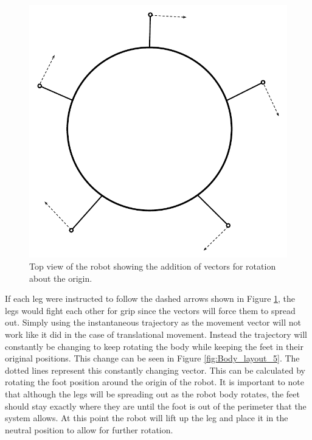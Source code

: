 \FloatBarrier
\begin{figure}[h]
\centering
\includegraphics[scale = 1]{pics/Body_Layout_4.pdf}
\caption{Top view of the robot showing the addition of vectors for rotation about the origin.}
\label{fig:Body_layout_4}
\end{figure}
\FloatBarrier

If each leg were instructed to follow the dashed arrows shown in Figure \ref{fig:Body_layout_4}, the legs would fight each other for grip since the vectors will force them to spread out. Simply using the instantaneous trajectory as the movement vector will not work like it did in the case of translational movement. Instead the trajectory will constantly be changing to keep rotating the body while keeping the feet in their original positions. This change can be seen in Figure \ref{fig:Body_layout_5}. The dotted lines represent this constantly changing vector. This can be calculated by rotating the foot position around the origin of the robot. It is important to note that although the legs will be spreading out as the robot body rotates, the feet should stay exactly where they are until the foot is out of the perimeter that the system allows. At this point the robot will lift up the leg and place it in the neutral position to allow for further rotation.

